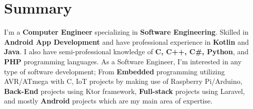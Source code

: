 

\textcolor{darkgray}{\noindent\makebox[\linewidth]{\rule{\maxdimen}{2pt}}}

\section*{\LARGE{Summary}}
I'm a \textbf{Computer Engineer} specializing in \textbf{Software Engineering}.
Skilled in \textbf{Android App Development} and have professional experience in \textbf{Kotlin} and \textbf{Java}.
I also have semi-professional knowledge of \textbf{C, C++, C\#, Python}, and \textbf{PHP} programming languages.
As a Software Engineer, I'm interested in any type of software development;
From \textbf{Embedded} programming utilizing AVR/ATmega with C, \textbf{}IoT projects by making use of Raspberry Pi/Arduino,
\textbf{Back-End} projects using Ktor framework, \textbf{Full-stack} projects using Laravel, and mostly \textbf{Android} projects which are my main area of expertise.\\
\textcolor{darkgray}{\noindent\makebox[\linewidth]{\rule{\maxdimen}{2pt}}}

\begin{multicols}{2}
    

    
\end{multicols}
\textcolor{darkgray}{\noindent\makebox[\linewidth]{\rule{\maxdimen}{2pt}}}

